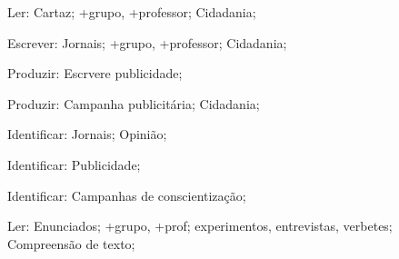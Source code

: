  Ler: Cartaz; +grupo, +professor; Cidadania;

 Escrever: Jornais; +grupo, +professor; Cidadania;

 Produzir: Escrvere publicidade; 

 Produzir: Campanha publicitária; Cidadania;

 Identificar: Jornais; Opinião;

 Identificar: Publicidade;

 Identificar: Campanhas de conscientização;

 Ler: Enunciados; +grupo, +prof; experimentos, entrevistas, verbetes; Compreensão de texto;


